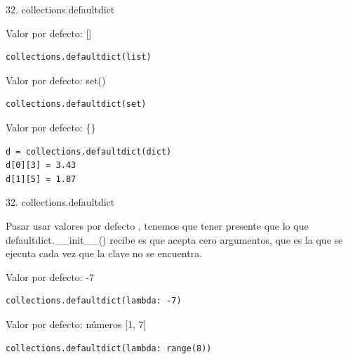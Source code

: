 \documentclass[14pt]{beamer}
\begin{document}
\begin{frame}[fragile]{32. collections.defaultdict}
  \small
  \begin{exampleblock}
    {Valor por defecto: []}
    \begin{lstlisting}
collections.defaultdict(list)
    \end{lstlisting}
  \end{exampleblock}

  \small
  \begin{exampleblock}
    {Valor por defecto: set()}
    \begin{lstlisting}
collections.defaultdict(set)
    \end{lstlisting}
  \end{exampleblock}

  \begin{exampleblock}
    {Valor por defecto: \{\}}
    \begin{lstlisting}
d = collections.defaultdict(dict)
d[0][3] = 3.43
d[1][5] = 1.87
    \end{lstlisting}
  \end{exampleblock}
\end{frame}

\begin{frame}[fragile]{32. collections.defaultdict}
  \small
  \begin{block}{}
    \centering
    Pasar usar valores por defecto , tenemos que tener presente que lo que
    defaultdict.\_\_init\_\_() recibe es  que
    acepta cero argumentos, que es la que se ejecuta cada vez que la
    clave no se encuentra.
  \end{block}

  \begin{exampleblock}
    {Valor por defecto: -7}
    \begin{lstlisting}
collections.defaultdict(lambda: -7)
    \end{lstlisting}
  \end{exampleblock}

  \begin{exampleblock}
    {Valor por defecto: números [1, 7]}
    \begin{lstlisting}
collections.defaultdict(lambda: range(8))
    \end{lstlisting}
  \end{exampleblock}
\end{frame}
\end{document}
